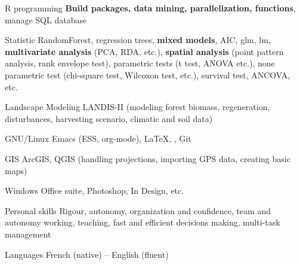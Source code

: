 



  \begin{cvskillslong}


  \cvskilllong
    {R programming} %
    {\textnormal{\textbf{Build packages, data mining, parallelization,
          functions}, manage SQL database}} %

  \cvskilllong
    {Statistic} %
    {\textnormal{RandomForest, regression trees, \textbf{mixed models}, AIC, glm, lm,
           \textbf{multivariate analysis} (PCA, RDA, etc.), \textbf{spatial analysis} (point pattern
          analysis, rank envelope test), parametric tests (t test, ANOVA etc.), none
          parametric test (chi-square test, Wilcoxon test, etc.),
          survival test, ANCOVA, etc.}} %

  \cvskilllong
    {Landscape Modeling} %
    {\textnormal{LANDIS-II (modeling forest biomass, regeneration, disturbances,
        harvesting scenario, climatic and soil data)}} %

  \cvskilllong
    {GNU/Linux} %
    {\textnormal{Emacs (ESS, org-mode), {\LaTeX}, , Git}} %

   
  \cvskilllong
    {GIS} %
    {\textnormal{ArcGIS, QGIS (handling
        projections, importing GPS data, creating basic maps)}} %
   
  \cvskilllong
    {Windows} %
    {\textnormal{Office suite, Photoshop, In Design, etc.}} %
    


  \cvskilllong
  {Personal skills}
  {\textnormal{Rigour, autonomy, organization and confidence, team and autonomy
    working, teaching, fast and efficient decisions making, multi-task
    management}}

  \cvskilllong
    {Languages} %
    {\textnormal{French (native) – English (fluent)}} %

\end{cvskillslong}

